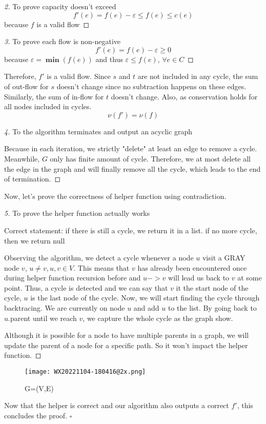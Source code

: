 \documentclass[openany]{article}
\begin{document}
\begin{proof}[2]{To prove capacity doesn't exceed}
    \[f'(e) = f(e) - \varepsilon \leq f(e) \leq c(e)\] because $f$ is a valid flow
    
\end{proof}

\begin{proof}[3]{To prove each flow is non-negative}
    \[f'(e) = f(e) - \varepsilon \geq 0\] because $\varepsilon = \mathbf{\min}(f(e))$ and thus $\varepsilon \leq f(e)$, $\forall e \in C$
    
\end{proof}

Therefore, $f'$ is a valid flow. Since $s$ and $t$ are not included in any cycle, the sum of out-flow for $s$ doesn't change since no subtraction happens on these edges. Similarly, the sum of in-flow for $t$ doesn't change. Also, as conservation holds for all nodes included in cycles.
\[\nu(f') = \nu(f)\]

\begin{proof}[4]{To the algorithm terminates and output an acyclic graph}

Because in each iteration, we strictly "delete" at least an edge to remove a cycle. Meanwhile, $G$ only has finite amount of cycle. Therefore, we at most delete all the edge in the graph and will finally remove all the cycle, which leads to the end of termination.


\end{proof}

Now, let's prove the correctness of helper function using contradiction.
\begin{proof}[5]{To prove the helper function actually works}

Correct statement: if there is still a cycle, we return it in a list. if no more cycle, then we return null

Observing the algorithm, we detect a cycle whenever a node $u$ visit a GRAY node $v$, $u\neq v, u,v \in V$. This means that $v$ has already been encountered once during helper function recursion before and $u->v$ will lead us back to $v$ at some point. Thus, a cycle is detected and we can say that $v$ it the start node of the cycle, $u$ is the last node of the cycle. Now, we will start finding the cycle through backtracing. We are currently on node $u$ and add $u$ to the list. By going back to $u$.parent until we reach $v$, we capture the whole cycle as the graph show.

Although it is possible for a node to have multiple parents in a graph, we will update the parent of a node for a specific path. So it won't impact the helper function.

\end{proof}
\begin{figure}[htp]
    \centering
    \texttt{[image: WX20221104-180416@2x.png]}
    \caption{G=(V,E)}
    \label{fig:galaxy}
\end{figure}
Now that the helper is correct and our algorithm also outputs a correct $f'$, this concludes the proof. $\square$
\end{document}
